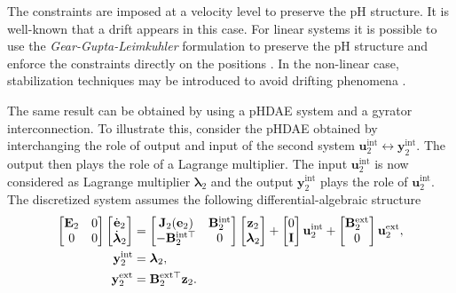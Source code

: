 \documentclass{svjour3}                     %
\newcommand{\secondRev}[1]{\textcolor{blue!80!black}{#1}}
\begin{document}
	\begin{remark}
		\secondRev{The constraints  are imposed at a velocity level to preserve the pH structure. It is well-known that a drift appears in this case. For linear systems it is possible to use the \textit{Gear-Gupta-Leimkuhler} formulation to preserve the pH structure and enforce the constraints directly on the positions \cite{scholz2019}. In the non-linear case, stabilization techniques may be introduced to avoid drifting phenomena \cite{bauchau2008review,laulusa2008review}.} 
	\end{remark}
	
	The same result can be obtained by using a pHDAE system and a gyrator interconnection. To illustrate this, consider the pHDAE obtained by interchanging the role of output and input of the second system $\mathbf{u}_2^{\text{int}} \leftrightarrow \mathbf{y}_2^{\text{int}}$. The output then plays the role of a Lagrange multiplier. The input $\mathbf{u}_2^{\text{int}}$ is now considered as Lagrange multiplier ${\bm{\lambda}}_2$ and the output $\mathbf{y}_2^{\text{int}}$ plays the role of $\mathbf{u}_2^{\text{int}}$. The discretized system assumes the following differential-algebraic structure
	\begin{equation}
	\begin{aligned}
	\begin{bmatrix}
	\mathbf{E}_2 & 0 \\
	0 & 0 \\
	\end{bmatrix} \begin{bmatrix}
	\dot{\mathbf{e}}_2 \\
	\dot{\bm{\lambda}}_2 \\
	\end{bmatrix}
	&= \begin{bmatrix}
	\mathbf{J}_2(\mathbf{e}_2) & \mathbf{B}_2^{\text{int}} \\
	-\mathbf{B}_2^{\text{int} \top} & 0\\
	\end{bmatrix} \begin{bmatrix}
	\mathbf{z}_2 \\
	{\bm{\lambda}}_2
	\end{bmatrix} 
	+ \begin{bmatrix}
	0 \\
	\mathbf{I}
	\end{bmatrix} \mathbf{u}_2^{\text{int}} + \begin{bmatrix}
	\mathbf{B}_2^{\text{ext}} \\
	0 \\
	\end{bmatrix} \mathbf{u}_2^{\text{ext}},  \vspace{2mm} \\
	\mathbf{y}_2^{\text{int}} &= {\bm{\lambda}}_2, \\
	\mathbf{y}_2^{\text{ext}} &= \mathbf{B}_2^{\text{ext} \top} \mathbf{z}_2.
	\end{aligned}
	\end{equation}
\end{document}
